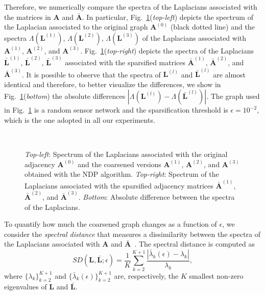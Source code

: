 \documentclass[journal]{IEEEtran}
\def\A{{\mathbf A}}
\def\L{{\mathbf L}}
\begin{document}
Therefore, we numerically compare the spectra of the Laplacians associated with the matrices in $\mathbf{A}$ and $\mathcal{\bar \A}$. 
In particular, Fig.~\ref{fig:spectra_diff}(\textit{top-left}) depicts the spectrum of the Laplacian associated to the original graph $\A^{(0)}$ (black dotted line) and the spectra $\Lambda(\L^{(1)})$, $\Lambda(\L^{(2)})$, $\Lambda(\L^{(3)})$ of the Laplacians associated with $\A^{(1)}$, $\A^{(2)}$, and $\A^{(3)}$.
Fig.~\ref{fig:spectra_diff}(\textit{top-right}) depicts the spectra of the Laplacians $\bar \L^{(1)}$, $\bar \L^{(2)}$, $\bar \L^{(3)}$ associated with the sparsified matrices $\bar \A^{(1)}$, $\bar \A^{(2)}$, and $\bar \A^{(3)}$.
It is possible to observe that the spectra of $\L^{(l)}$ and $\bar \L^{(l)}$ are almost identical and therefore, to better visualize the differences, we show in Fig.~\ref{fig:spectra_diff}(\textit{bottom}) the absolute differences $|\Lambda (\L^{(l)}) - \Lambda(\bar \L^{(l)})|$.
The graph used in Fig.~\ref{fig:spectra_diff} is a random sensor network and the sparsification threshold is $\epsilon = 10^{-2}$, which is the one adopted in all our experiments.
\begin{figure}[!ht]
    \centering
    \hspace{-.6cm}~

    \caption{
    \textit{Top-left}: Spectrum of the Laplacians associated with the original adjacency $\A^{(0)}$ and the coarsened versions $\A^{(1)}$, $\A^{(2)}$, and $\A^{(3)}$ obtained with the NDP algorithm. 
    \textit{Top-right}: Spectrum of the Laplacians associated with the sparsified adjacency matrices $\bar \A^{(1)}$, $\bar \A^{(2)}$, and $\bar \A^{(3)}$.
    \textit{Bottom}: Absolute difference between the spectra of the Laplacians.
    }
    \label{fig:spectra_diff}
\end{figure}

To quantify how much the coarsened graph changes as a function of $\epsilon$, we consider the \emph{spectral distance} that measures a dissimilarity between the spectra of the Laplacians associated with $\A$ and $\bar \A$~\cite{loukas2019graph}. 
The spectral distance is computed as 
\begin{equation}
    SD(\L, \bar \L; \epsilon) = \frac{1}{K} \sum_{k=2}^{K+1} \frac{|\bar\lambda_k(\epsilon) - \lambda_k|}{\lambda_k},
\end{equation}
where $\{ \lambda_k \}_{k=2}^{K+1}$ and $\{ \bar \lambda_k(\epsilon) \}_{k=2}^{K+1}$ are, respectively, the $K$ smallest non-zero eigenvalues of $\L$ and $\bar{\L}$.
\end{document}
